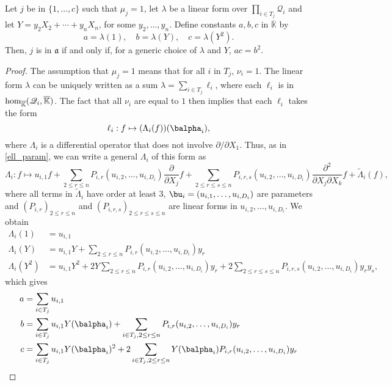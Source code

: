 \documentclass[12pt]{article}
\newcommand{\mf}{Y}
\newcommand{\residueI}{\mathscr{Q}}
\def\Kbar {{\ensuremath{\overline{\mathbb{K}}}}}
\begin{document}
\begin{lemma}\label{lemma:acb2}
  Let $j$ be in $\{1,\dots,c\}$ such that $\mu_j=1$, let $\lambda$ be
  a linear form over $\prod_{i \in T_j} \residueI_i$ and let $\mf=y_2
  X_2 + \cdots + y_n X_n$, for some $y_2,\dots,y_n$. Define constants
  $a,b,c$ in $\Kbar$ by
  $$a=\lambda(1),\quad b=\lambda(\mf),\quad c=\lambda(\mf^2).$$
  Then, $j$ is in $\mathfrak{a}$
  if and only if, for a generic choice of $\lambda$ and $\mf$, $ac=b^2$.
\end{lemma}
\begin{proof}
  The assumption that $\mu_j=1$ means that for all $i$ in $T_j$,
  $\nu_i=1$. The linear 
  form $\lambda$ can be uniquely written as a sum $\lambda=\sum_{i \in T_j}
  \ell_i$, where each $\ell_i$ is in ${\rm hom}_\Kbar(\residueI_i,\Kbar)$.
  The fact that all $\nu_i$ are equal to $1$ then implies that each $\ell_i$ takes the form 
  $$\ell_i: f \mapsto (\Lambda_{i}(f))(\balpha_i),$$
  where $\Lambda_{i}$ is a differential operator that does not 
  involve $\partial/\partial X_1$. Thus, as in \cref{ell_param}, we can write a general
  $\Lambda_i$ of this form as
  $$\Lambda_i: f \mapsto u_{i,1} f + \sum_{2 \le r \le n}
  P_{i,r}(u_{i,2},\dots,u_{i,D_i}) \frac{\partial}{\partial X_j} f +
  \sum_{2 \le r \le s \le n} P_{i,r,s}(u_{i,2},\dots,u_{i,D_i})
  \frac{\partial^2}{\partial X_j\partial X_k} f +
  \tilde\Lambda_i(f),$$ where all terms in $\tilde \Lambda_i$ have
  order at least $3$, $\bu_i=(u_{i,1},\dots,u_{i,D_i})$ are parameters and
  $(P_{i,r})_{2 \le r \le n}$ and $(P_{i,r,s})_{2 \le r \le s \le n}$
  are linear forms in $u_{i,2},\dots,u_{i,D_i}$.
  We obtain
  \begin{align*}
    \Lambda_i(1)   &= u_{i,1} \\
    \Lambda_i(\mf)   &= u_{i,1} \mf +\sum_{2 \le r \le n}P_{i,r}(u_{i,2},\dots,u_{i,D_i})y_r \\
    \Lambda_i(\mf^2) &= u_{i,1} \mf^2  +2 \mf \sum_{2 \le r \le n}P_{i,r}(u_{i,2},\dots,u_{i,D_i})y_r + 
    2\sum_{2 \le r \le s \le n} P_{i,r,s}(u_{i,2},\dots,u_{i,D_i})y_ry_s,
  \end{align*}
  which gives
  \begin{align*}
    a  &= \sum_{i\in T_j}u_{i,1} \\
    b  &= \sum_{i\in T_j}u_{i,1} \mf(\balpha_i) +\sum_{i \in T_j, 2 \le r \le n}P_{i,r}(u_{i,2},\dots,u_{i,D_i})y_r \\
    c &= \sum_{i\in T_j}u_{i,1} \mf(\balpha_i)^2  +2  \sum_{i \in T_j, 2 \le r \le n}\mf(\balpha_i) P_{i,r}(u_{i,2},\dots,u_{i,D_i})y_r    

\end{align*}
\end{proof}
\end{document}
